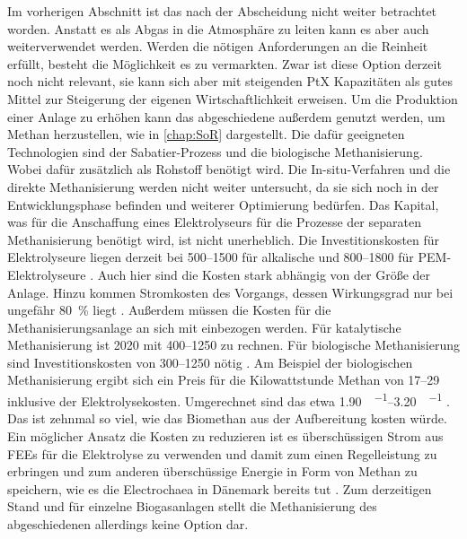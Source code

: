 Im vorherigen Abschnitt ist das  nach der Abscheidung nicht weiter betrachtet worden. Anstatt es als Abgas in die Atmosphäre zu leiten kann es aber auch weiterverwendet werden. Werden die nötigen Anforderungen an die Reinheit erfüllt, besteht die Möglichkeit es zu vermarkten. Zwar ist diese Option derzeit noch nicht relevant, sie kann sich aber mit steigenden PtX Kapazitäten als gutes Mittel zur Steigerung der eigenen Wirtschaftlichkeit erweisen. \parencite{UmBA19} \newline
Um die Produktion einer Anlage zu erhöhen kann das abgeschiedene  außerdem genutzt werden, um Methan herzustellen, wie in \ref{chap:SoR} dargestellt. Die dafür geeigneten Technologien sind der Sabatier-Prozess und die biologische Methanisierung. Wobei dafür zusätzlich  als Rohstoff benötigt wird. Die In-situ-Verfahren und die direkte Methanisierung werden nicht weiter untersucht, da sie sich noch in der Entwicklungsphase befinden und weiterer Optimierung bedürfen. Das Kapital, was für die Anschaffung eines Elektrolyseurs für die Prozesse der separaten Methanisierung benötigt wird, ist nicht unerheblich. Die Investitionskosten für Elektrolyseure liegen derzeit bei \SIrange{500}{1500}{\Eurkw} für alkalische und \SIrange{800}{1800}{\Eurkw} für PEM-Elektrolyseure \parencite{dena2018b}. Auch hier sind die Kosten stark abhängig von der Größe der Anlage. Hinzu kommen Stromkosten des Vorgangs, dessen Wirkungsgrad nur bei ungefähr \SI{80}{\percent} liegt \parencite{dena2018b}. Außerdem müssen die Kosten für die Methanisierungsanlage an sich mit einbezogen werden. Für katalytische Methanisierung ist \SI{2020}{\relax} mit \SIrange{400}{1250}{\Eurkw} zu rechnen. Für biologische Methanisierung sind Investitionskosten von \SIrange{300}{1250}{\Eurkw} nötig \parencite{dena2018b}. Am Beispiel der biologischen Methanisierung ergibt sich ein Preis für die Kilowattstunde Methan von \SIrange{17}{29}{\ct} inklusive der Elektrolysekosten. Umgerechnet sind das etwa \SIrange{1,90}{3,20}{\sieuro\per\normvol} \parencite{4.2b17}. Das ist zehnmal so viel, wie das Biomethan aus der Aufbereitung kosten würde. Ein möglicher Ansatz die Kosten zu reduzieren ist es überschüssigen Strom aus \glspl{FEE} für die Elektrolyse zu verwenden und damit zum einen Regelleistung zu erbringen und zum anderen überschüssige Energie in Form von Methan zu speichern, wie es die Electrochaea in Dänemark bereits tut \parencite{Chaea20}. Zum derzeitigen Stand und für einzelne Biogasanlagen stellt die Methanisierung des abgeschiedenen  allerdings keine Option dar.


